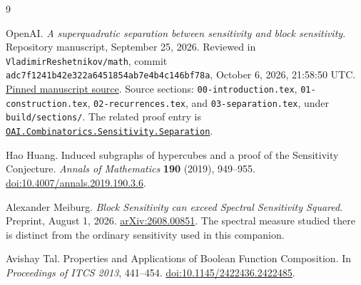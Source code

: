\documentclass[11pt]{article}
\theoremstyle{definition}
\theoremstyle{remark}
\begin{document}
\begin{thebibliography}{9}

\begingroup
\raggedright
OpenAI.
\emph{A superquadratic separation between sensitivity and block
sensitivity}. Repository manuscript, September 25, 2026.
Reviewed in \texttt{VladimirReshetnikov/math}, commit
\texttt{adc7f1241b42e322a6451854ab7e4b4c146bf78a},
October 6, 2026, 21:58:50 UTC.
\href{https://github.com/VladimirReshetnikov/math/tree/adc7f1241b42e322a6451854ab7e4b4c146bf78a/preprints/A-superquadratic-separation-between-sensitivity-and-block-sensitivity-September-25-2026/build}{Pinned manuscript source}.
Source sections: \texttt{00-introduction.tex},
\texttt{01-construction.tex}, \texttt{02-recurrences.tex}, and
\texttt{03-separation.tex}, under \texttt{build/sections/}.
The related proof entry is
\href{https://github.com/VladimirReshetnikov/math/blob/adc7f1241b42e322a6451854ab7e4b4c146bf78a/lean/OAI/Combinatorics/Sensitivity/Separation.lean}{\texttt{OAI.Combinatorics.Sensitivity.Separation}}.
\par
\endgroup

Hao Huang.
Induced subgraphs of hypercubes and a proof of the Sensitivity Conjecture.
\emph{Annals of Mathematics} \textbf{190} (2019), 949--955.
\href{https://doi.org/10.4007/annals.2019.190.3.6}{doi:10.4007/annals.2019.190.3.6}.

Alexander Meiburg.
\emph{Block Sensitivity can exceed Spectral Sensitivity Squared}.
Preprint, August 1, 2026.
\href{https://arxiv.org/abs/2608.00851}{arXiv:2608.00851}.
The spectral measure studied there is distinct from the ordinary
sensitivity used in this companion.

Avishay Tal.
Properties and Applications of Boolean Function Composition.
In \emph{Proceedings of ITCS 2013}, 441--454.
\href{https://doi.org/10.1145/2422436.2422485}{doi:10.1145/2422436.2422485}.

\end{thebibliography}
\end{document}
